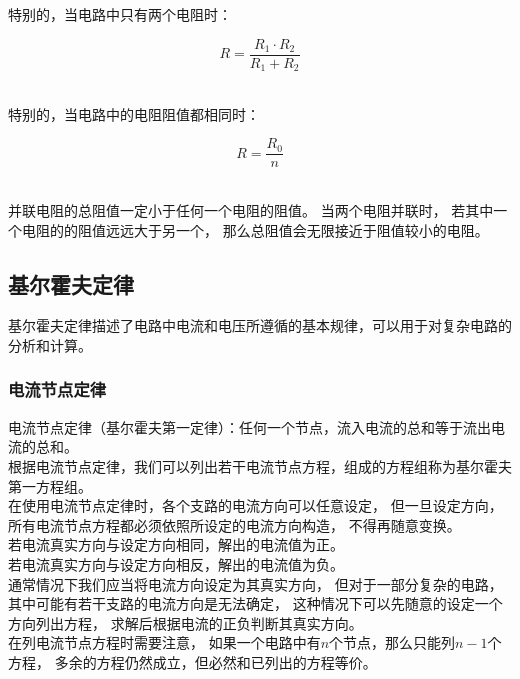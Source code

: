 \documentclass[UTF8]{ctexart}
\begin{document}
    特别的，当电路中只有两个电阻时：
    \begin{large}
        \begin{equation*}
            R=\frac{R_1 \cdot R_2}{R_1+R_2}
        \end{equation*}
    \end{large}\\[1mm]
    特别的，当电路中的电阻阻值都相同时：
    \begin{large}
        \begin{equation*}
            R=\frac{R_0}{n}
        \end{equation*}
    \end{large}\\[1mm]
    并联电阻的总阻值一定小于任何一个电阻的阻值。
    当两个电阻并联时，
    若其中一个电阻的的阻值远远大于另一个，
    那么总阻值会无限接近于阻值较小的电阻。

\newpage

\subsection{基尔霍夫定律}
    基尔霍夫定律描述了电路中电流和电压所遵循的基本规律，可以用于对复杂电路的分析和计算。

\subsubsection{电流节点定律}
    电流节点定律（基尔霍夫第一定律）：任何一个节点，流入电流的总和等于流出电流的总和。\\[3mm]
    根据电流节点定律，我们可以列出若干电流节点方程，组成的方程组称为基尔霍夫第一方程组。\\[3mm]
    在使用电流节点定律时，各个支路的电流方向可以任意设定，
    但一旦设定方向，所有电流节点方程都必须依照所设定的电流方向构造，
    不得再随意变换。\\[3mm]
    若电流真实方向与设定方向相同，解出的电流值为正。\\[2mm]
    若电流真实方向与设定方向相反，解出的电流值为负。\\[3mm]
    通常情况下我们应当将电流方向设定为其真实方向，
    但对于一部分复杂的电路，其中可能有若干支路的电流方向是无法确定，
    这种情况下可以先随意的设定一个方向列出方程，
    求解后根据电流的正负判断其真实方向。\\[3mm]
    在列电流节点方程时需要注意，
    如果一个电路中有$n$个节点，那么只能列$n-1$个方程，
    多余的方程仍然成立，但必然和已列出的方程等价。
\end{document}
